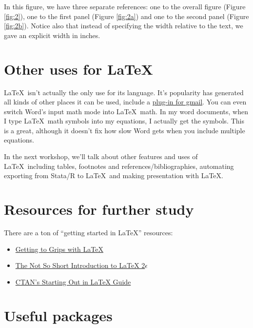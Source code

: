 \documentclass{article}
\begin{document}
In this figure, we have three separate references: one to the overall figure (Figure \ref{fig:2}), one to the first panel (Figure \ref{fig:2a}) and one to the second panel (Figure \ref{fig:2b}). Notice also that instead of specifying the width relative to the text, we gave an explicit width in inches.

\section{Other uses for \LaTeX}

\LaTeX\ isn't actually the only use for its language. It's popularity has generated all kinds of other places it can be used, include a \href{https://chrome.google.com/webstore/detail/tex-for-gmail-inbox/gjnmclkoadjdljnfmbnnhaahilafoeji?hl=en}{plug-in for gmail}. You can even switch Word's input math mode into \LaTeX\ math. In my word documents, when I type \LaTeX\ math symbols into my equations, I actually get the symbols. This is a great, although it doesn't fix how slow Word gets when you include multiple equations.

In the next workshop, we'll talk about other features and uses of \LaTeX\ including tables, footnotes and references/bibliographies, automating exporting from Stata/R to \LaTeX\ and making presentation with \LaTeX.

\section{Resources for further study}

There are a ton of ``getting started in \LaTeX'' resources:
\begin{itemize}
	\item \href{http://www.andy-roberts.net/writing/latex}{Getting to Grips with LaTeX}
	\item \href{ftp://ctan.tug.org/tex-archive/info/lshort/english/lshort.pdf}{The Not So Short Introduction to LaTeX 2$\epsilon$}
	\item \href{https://www.ctan.org/starter}{CTAN's Starting Out in LaTeX Guide}
\end{itemize}

\clearpage
\appendix
\section{Useful packages}
\end{document}
